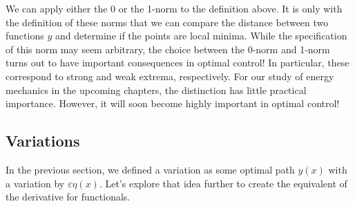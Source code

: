 We can apply either the 0 or the 1-norm to the definition above. It is only with the definition of these norms that we can compare the distance between two functions $y$ and determine if the points are local minima. While the specification of this norm may seem arbitrary, the choice between the 0-norm and 1-norm turns out to have important consequences in optimal control! In particular, these correspond to strong and weak extrema, respectively. For our study of energy mechanics in the upcoming chapters, the distinction has little practical importance. However, it will soon become highly important in optimal control!

\subsection{Variations}
In the previous section, we defined a variation as some optimal path $y(x)$ with a variation by $\varepsilon\eta(x)$. Let's explore that idea further to create the equivalent of the derivative for functionals.

